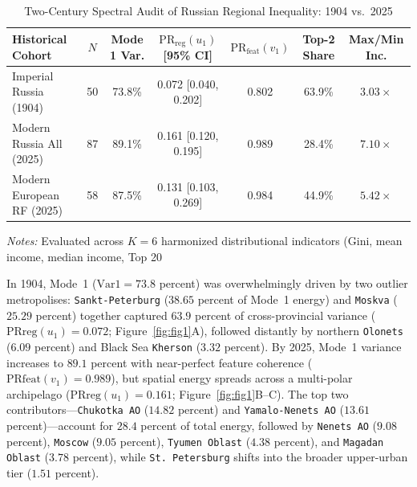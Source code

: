 \documentclass[11pt,a4paper]{article}
\begin{document}
\begin{table}[htbp]
\centering
\caption{Two-Century Spectral Audit of Russian Regional Inequality: 1904 vs.\ 2025}
\label{tab:two_centuries}
\scriptsize
\setlength{\tabcolsep}{2.4pt}
\begin{tabular}{@{}p{}cccccc@{}}
\toprule
\textbf{Historical Cohort} & \textbf{$N$} & \textbf{Mode 1 Var.} & \textbf{$\mathrm{PR}_{\mathrm{reg}}(u_1)$ [95\% CI]} & \textbf{$\mathrm{PR}_{\mathrm{feat}}(v_1)$} & \textbf{Top-2 Share} & \textbf{Max/Min Inc.} \tabularnewline
\midrule
Imperial Russia (1904) & 50 & 73.8\% & 0.072 [0.040, 0.202] & 0.802 & 63.9\% & $3.03\times$ \tabularnewline
Modern Russia All (2025) & 87 & 89.1\% & 0.161 [0.120, 0.195] & 0.989 & 28.4\% & $7.10\times$ \tabularnewline
Modern European RF (2025) & 58 & 87.5\% & 0.131 [0.103, 0.269] & 0.984 & 44.9\% & $5.42\times$ \tabularnewline
\bottomrule
\end{tabular}
\vspace{1mm}
\begin{minipage}{\textwidth}
\footnotesize\emph{Notes:} Evaluated across $K = 6$ harmonized distributional indicators (Gini, mean income, median income, Top 20%
\end{minipage}
\end{table}
In 1904, Mode~1 ($\mathrm{Var}1 = 73.8$ percent) was overwhelmingly driven by two outlier metropolises: \texttt{Sankt-Peterburg} ($38.65$ percent of Mode~1 energy) and \texttt{Moskva} ($25.29$ percent) together captured $63.9$ percent of cross-provincial variance ($\mathrm{PR}{\mathrm{reg}}(u_1) = 0.072$; Figure~\ref{fig:fig1}A), followed distantly by northern \texttt{Olonets} ($6.09$ percent) and Black Sea \texttt{Kherson} ($3.32$ percent). By 2025, Mode~1 variance increases to $89.1$ percent with near-perfect feature coherence ($\mathrm{PR}{\mathrm{feat}}(v_1) = 0.989$), but spatial energy spreads across a multi-polar archipelago ($\mathrm{PR}{\mathrm{reg}}(u_1) = 0.161$; Figure~\ref{fig:fig1}B--C). The top two contributors—\texttt{Chukotka AO} ($14.82$ percent) and \texttt{Yamalo-Nenets AO} ($13.61$ percent)—account for $28.4$ percent of total energy, followed by \texttt{Nenets AO} ($9.08$ percent), \texttt{Moscow} ($9.05$ percent), \texttt{Tyumen Oblast} ($4.38$ percent), and \texttt{Magadan Oblast} ($3.78$ percent), while \texttt{St.~Petersburg} shifts into the broader upper-urban tier ($1.51$ percent).
\end{document}
